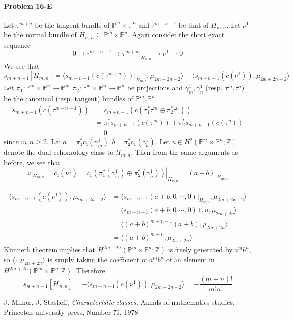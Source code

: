 \documentclass[12pt]{article}
\theoremstyle{plain}
\theoremstyle{definition}
\newcommand{\IP}{\mathbb{P}}
\newcommand{\IZ}{\mathbb{Z}}
\newcommand{\<}{\langle}
\renewcommand{\>}{\rangle}
\begin{document}
\paragraph{Problem 16-E}
Let $\tau^{m + n}$ be the tangent bundle of $\IP^m \times \IP^n$ and $\tau^{m + n - 1}$ be that of $H_{m, n}$. Let $\nu^1$ be the normal bundle of $H_{m, n} \subseteq \IP^m \times \IP^n$. Again consider the short exact sequence 
$$ 0 \to \tau^{m + n - 1} \to \tau^{m + n}|_{H_{m, n}} \to \nu^1 \to 0 $$
We see that 
$$ s_{m + n - 1}[H_{m, n}] = \< s_{m + n -1}(c(\tau^{m + n}))|_{H_{m, n}}, \mu_{2m + 2n - 2} \> - \< s_{m + n - 1}(c(\nu^1)), \mu_{2m + 2n - 2}\> $$
Let $\pi_1 : \IP^m \times \IP^n \to \IP^m$ $\pi_2 : \IP^m \times \IP^n \to \IP^n$ be projections and $\gamma^1_m, \gamma^1_n$ (resp. $\tau^m, \tau^n$) be the canonical (resp. tangent) bundles of $\IP^m, \IP^n$. 
\begin{align*}
s_{m + n - 1}(c(\tau^{m + n - 1})) &= s_{m + n - 1}(c(\pi_1^* \tau^m \oplus \pi_2^* \tau^n)) \\ &= \pi_1^* s_{m + n - 1}(c(\tau^m)) + \pi_2^* s_{m + n - 1}(c(\tau^n)) \\ &= 0 
\end{align*} 
since $m, n \ge 2$. Let $a = \pi_1^* c_1(\gamma_m^1), b = \pi_2^* c_1(\gamma_n^1)$. Let $u \in H^{2}(\IP^m \times \IP^n; \IZ)$ denote the dual cohomology class to $H_{m, n}$. Then from the same arguments as before, we see that 
$$ u|_{H_{m, n}} = c_1(\nu^1) = c_1(\pi_1^*(\gamma_m^1) \oplus \pi_2^*(\gamma_n^1))|_{H_{m, n}} = (a + b)|_{H_{m, n}} $$ 

\begin{align*}
\< s_{m + n - 1}(c(\nu^1)), \mu_{2m + 2n - 2}\> &= \< s_{m + n - 1}(a + b, 0, \cdots, 0)|_{H_{m, n}}, \mu_{2m + 2n - 2}\> \\
&= \< s_{m + n - 1}(a + b, 0, \cdots, 0) \cup u, \mu_{2m + 2n}\> \\
&= \< (a + b)^{m + n - 1}(a + b), \mu_{2m + 2n}\> \\
&= \< (a + b)^{m + n}, \mu_{2m + 2n }\> 
\end{align*} 
K{\"u}nneth theorem implies that $H^{2m + 2n}(\IP^m \times \IP^n; \IZ)$ is freely generated by $a^m b^n$, so $\< \cdot, \mu_{2m + 2n}\>$ is simply taking the coefficient of $a^m b^n$ of an element in $H^{2m + 2n}(\IP^m \times \IP^n; \IZ)$. Therefore 
$$s_{m + n - 1}[H_{m, n}] = -\< s_{m + n - 1}(c(\nu^1)), \mu_{2m + 2n - 2}\> = -\frac{(m + n)!}{m! n !} $$

\begin{thebibliography}{9}


  J. Milnor, J. Stasheff, \textit{Characteristic classes}, Annals of mathematics studies, Princeton university press, Number 76, 1978
\end{thebibliography}
\end{document}
